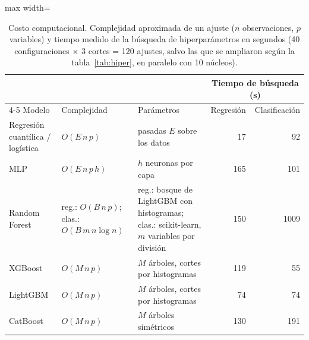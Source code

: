 \begin{table}[htbp]\centering\small
\caption{Costo computacional. Complejidad aproximada de un ajuste ($n$ observaciones, $p$ variables) y tiempo medido de la búsqueda de hiperparámetros en segundos (40 configuraciones $\times$ 3 cortes = 120 ajustes, salvo las que se ampliaron según la tabla~\ref{tab:hiper}, en paralelo con 10 núcleos).}\label{tab:costo}
\begin{adjustbox}{max width=\textwidth}\begin{tabular}{llp{4.3cm}rr}\toprule
& & & \multicolumn{2}{c}{Tiempo de búsqueda (s)}\\ \cmidrule(lr){4-5}
Modelo & Complejidad & Parámetros & Regresión & Clasificación\\ \midrule
Regresión cuantílica / logística & $O(E\,n\,p)$ & pasadas $E$ sobre los datos & 17 & 92 \\
MLP & $O(E\,n\,p\,h)$ & $h$ neuronas por capa & 165 & 101 \\
Random Forest & reg.: $O(B\,n\,p)$; clas.: $O(B\,m\,n\log n)$ & reg.: bosque de LightGBM con histogramas; clas.: scikit-learn, $m$ variables por división & 150 & 1009 \\
XGBoost & $O(M\,n\,p)$ & $M$ árboles, cortes por histogramas & 119 & 55 \\
LightGBM & $O(M\,n\,p)$ & $M$ árboles, cortes por histogramas & 74 & 74 \\
CatBoost & $O(M\,n\,p)$ & $M$ árboles simétricos & 130 & 191 \\
\bottomrule\end{tabular}\end{adjustbox}\end{table}
